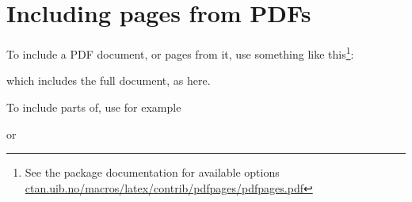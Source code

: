 \chapter{Including pages from PDFs}
\label{chap:pdfs} 

To include a PDF document, or pages from it, use something like this\footnote{See the package documentation for available options \url{ctan.uib.no/macros/latex/contrib/pdfpages/pdfpages.pdf}}: 

\verb||

which includes the full document, as here\parencite{holone2007users}.

To include parts of, use for example

\verb|| 

or 

\verb||


